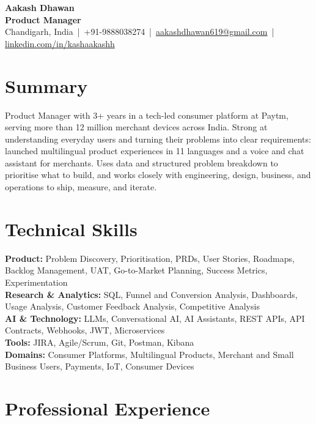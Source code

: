 \documentclass[10pt,a4paper]{article}
\begin{document}
\begin{center}
  {\LARGE \textbf{Aakash Dhawan}}\\[2pt]
  \textbf{Product Manager} \\[2pt]
  Chandigarh, India \,|\, +91-9888038274 \,|\, \href{mailto:aakashdhawan619@gmail.com}{aakashdhawan619@gmail.com} \,|\, \href{https://linkedin.com/in/kashaakashh}{linkedin.com/in/kashaakashh}
\end{center}

\section*{Summary}
Product Manager with 3+ years in a tech-led consumer platform at Paytm, serving more than 12 million merchant devices across India. Strong at understanding everyday users and turning their problems into clear requirements: launched multilingual product experiences in 11 languages and a voice and chat assistant for merchants. Uses data and structured problem breakdown to prioritise what to build, and works closely with engineering, design, business, and operations to ship, measure, and iterate.

\section*{Technical Skills}
\textbf{Product:} Problem Discovery, Prioritisation, PRDs, User Stories, Roadmaps, Backlog Management, UAT, Go-to-Market Planning, Success Metrics, Experimentation\\
\textbf{Research \& Analytics:} SQL, Funnel and Conversion Analysis, Dashboards, Usage Analysis, Customer Feedback Analysis, Competitive Analysis\\
\textbf{AI \& Technology:} LLMs, Conversational AI, AI Assistants, REST APIs, API Contracts, Webhooks, JWT, Microservices\\
\textbf{Tools:} JIRA, Agile/Scrum, Git, Postman, Kibana\\
\textbf{Domains:} Consumer Platforms, Multilingual Products, Merchant and Small Business Users, Payments, IoT, Consumer Devices

\section*{Professional Experience}
\end{document}
